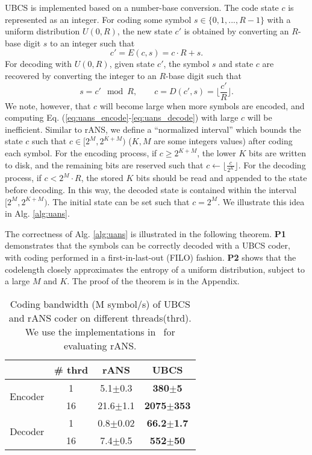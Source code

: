 \documentclass{article}
\newcommand{\ebar}[1]{{\tiny $\pm$#1}}
\begin{document}
UBCS is implemented based on a number-base conversion. The code state $c$ is represented as an integer.
For coding some symbol $s \in \{0,1,...,R-1\}$ with a uniform distribution $U(0, R)$, the new state $c'$ is obtained by converting an $R$-base digit $s$ to an integer such that 
\begin{equation}
    c' = E(c, s) = c \cdot R + s.
\label{eq:uans_encode}
\end{equation}
For decoding with $U(0, R)$, given state $c'$, the symbol $s$ and state $c$ are recovered by converting the integer to an $R$-base digit such that 
\begin{equation}
    s = c' \mod R, \qquad c = D(c', s) = \lfloor \frac{c'}{R} \rfloor.
\label{eq:uans_decode}
\end{equation}
We note, however, that $c$ will become large when more symbols are encoded, and computing Eq. (\ref{eq:uans_encode}-\ref{eq:uans_decode}) with large $c$ will be inefficient. Similar to rANS, we define a ``normalized interval'' which bounds the state $c$ such that $c \in [2^M, 2^{K+M})$ ($K, M$ are some integers values) after coding each symbol. For the encoding process, if $c \ge 2^{K+M}$, the lower $K$ bits are written to disk, and the remaining bits are reserved such that $c \gets \lfloor \frac{c}{2^K} \rfloor$. For the decoding process, if $c < 2^M \cdot R$, the stored $K$ bits should be read and appended to the state before decoding. In this way, the decoded state is contained within the interval $[2^M, 2^{K+M})$. The initial state can be set such that $c = 2^M$. We illustrate this idea in Alg. \ref{alg:uans}.

The correctness of Alg. \ref{alg:uans} is illustrated in the following theorem. \textbf{P1} demonstrates that the symbols can be correctly decoded with a UBCS coder, with coding performed in a first-in-last-out (FILO) fashion. \textbf{P2} shows that the codelength closely approximates the entropy of a uniform distribution, subject to a large $M$ and $K$. The proof of the theorem is in the Appendix.

\begin{wraptable}{r}{5.5cm}
\vspace{-19pt}
\centering
\small
\caption{Coding bandwidth (M symbol/s) of UBCS and rANS coder on different threads(thrd). We use the implementations in~\cite{ho2019compression} for evaluating rANS.}
\label{tab:coders}
\begin{tabular}{cccc}
\toprule
 & \# thrd & rANS & \textbf{UBCS} \\
\midrule
\multirow{2}{*}{Encoder} & 1 & 5.1\ebar{0.3} & \bf 380\ebar{5} \\
 & 16 & 21.6\ebar{1.1} & \bf 2075\ebar{353} \\
\midrule
\multirow{2}{*}{Decoder} & 1 & 0.8\ebar{0.02} & \bf 66.2\ebar{1.7} \\
 & 16 & 7.4\ebar{0.5} & \bf 552\ebar{50} \\
\bottomrule
\end{tabular}
\vspace{-30pt}
\end{wraptable} 
\end{document}
